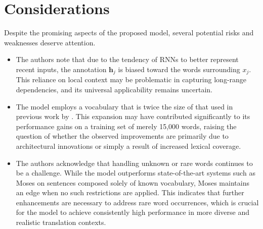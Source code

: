 \documentclass[10pt]{article}
\begin{document}
\section*{Considerations}
Despite the promising aspects of the proposed model, several potential risks and weaknesses deserve attention.

\begin{itemize}
    \item The authors note that due to the tendency of RNNs to better represent recent inputs, the annotation $\mathbf{h}_j$ is biased toward the words surrounding $x_j$. This reliance on local context may be problematic in capturing long-range dependencies, and its universal applicability remains uncertain.
    \item The model employs a vocabulary that is twice the size of that used in previous work by \cite{cho2014}. This expansion may have contributed significantly to its performance gains on a training set of merely 15,000 words, raising the question of whether the observed improvements are primarily due to architectural innovations or simply a result of increased lexical coverage.
    \item The authors acknowledge that handling unknown or rare words continues to be a challenge. While the model outperforms state-of-the-art systems such as Moses on sentences composed solely of known vocabulary, Moses maintains an edge when no such restrictions are applied. This indicates that further enhancements are necessary to address rare word occurrences, which is crucial for the model to achieve consistently high performance in more diverse and realistic translation contexts.
\end{itemize}
\end{document}
